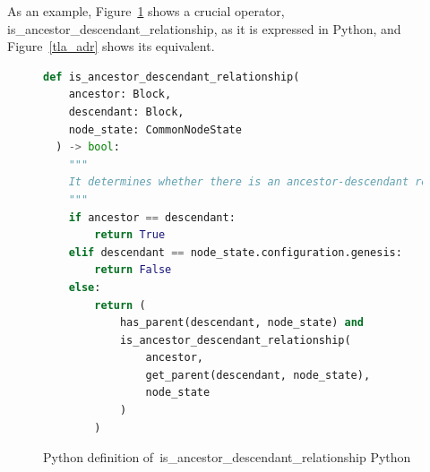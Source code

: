 As an example, Figure~\ref{py_adr} shows a crucial operator, \textsf{is\_ancestor\_descendant\_relationship}, as it is expressed in Python, and Figure~\ref{tla_adr} shows its \tlap{} equivalent.

\begin{figure}

  \begin{lstlisting}[style=mystyle,language=Python]
  def is_ancestor_descendant_relationship(
    ancestor: Block, 
    descendant: Block, 
    node_state: CommonNodeState
  ) -> bool:
    """
    It determines whether there is an ancestor-descendant relationship between two blocks.
    """
    if ancestor == descendant:
        return True
    elif descendant == node_state.configuration.genesis:
        return False
    else:
        return (
            has_parent(descendant, node_state) and
            is_ancestor_descendant_relationship(
                ancestor,
                get_parent(descendant, node_state),
                node_state
            )
        )
  \end{lstlisting}

  \caption{Python definition
      of~\textsf{is\_ancestor\_descendant\_relationship} Python}\label{py_adr}
\end{figure}

